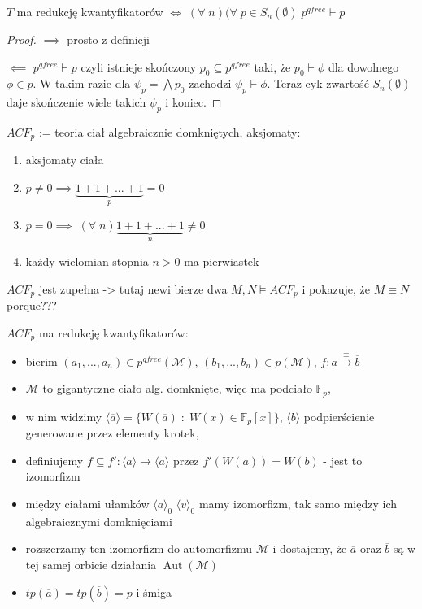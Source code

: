 \documentclass[a4paper, 12pt]{article}
\newcommand{\elementarna}{\xrightarrow{\equiv}}
\newcommand{\mMonster}{\mathcal{M}}
\DeclareMathOperator{\Aut}{Aut}
\begin{document}
\begin{theorem}{}{}
  $T$ ma redukcję kwantyfikatorów $\iff\;(\forall\;n)(\forall\;p\in S_n(\emptyset)\;p^{qfree}\vdash p$
\end{theorem}

\begin{proof}
  $\implies$ prosto z definicji

  $\impliedby$ $p^{qfree}\vdash p$ czyli istnieje skończony $p_0\subseteq p^{qfree}$ taki, że $p_0\vdash \phi$ dla dowolnego $\phi\in p$. W takim razie dla $\psi_p=\bigwedge p_0$ zachodzi $\psi_p\vdash \phi$. Teraz cyk zwartość $S_n(\emptyset)$ daje skończenie wiele takich $\psi_p$ i koniec. 
\end{proof}

$ACF_p$ := teoria ciał algebraicznie domkniętych, aksjomaty:
\begin{enumerate}
  \item aksjomaty ciała
  \item $p\neq 0\implies \underbrace{1+1+...+1}_p=0$
  \item $p=0\implies\;(\forall\;n)\underbrace{1+1+...+1}_n\neq 0$
  \item każdy wielomian stopnia $n>0$ ma pierwiastek
\end{enumerate}

$ACF_p$ jest zupełna -> tutaj newi bierze dwa $M,N\models ACF_p$ i pokazuje, że $M\equiv N$ {\color{red}porque???}

$ACF_p$ ma redukcję kwantyfikatorów: 
\begin{itemize}
  \item bierim $(a_1,...,a_n)\in p^{qfree}(\mMonster)$, $(b_1,...,b_n)\in p(\mMonster)$, $f:\overline{a}\elementarna\overline{b}$
  \item $\mMonster$ to gigantyczne ciało alg. domknięte, więc ma podciało $\mathbb{F}_p$, 
  \item w nim widzimy $\langle \overline{a}\rangle=\{W(\overline{a})\;:\;W(x)\in \mathbb{F}_p[x]\}$, $\langle \overline{b}\rangle$ podpierścienie generowane przez elementy krotek, 
  \item definiujemy $f\subseteq f':\langle a\rangle\to\langle a\rangle$ przez $f'(W(a))=W(b)$ - jest to izomorfizm
  \item między ciałami ułamków $\langle a\rangle_0$ $\langle v\rangle_0$ mamy izomorfizm, tak samo między ich algebraicznymi domknięciami
  \item rozszerzamy ten izomorfizm do automorfizmu $\mMonster$ i dostajemy, że $\overline{a}$ oraz $\overline{b}$ są w tej samej orbicie działania $\Aut(\mMonster)$
  \item $tp(\overline{a})=tp(\overline{b})=p$ i śmiga
\end{itemize}
\end{document}
